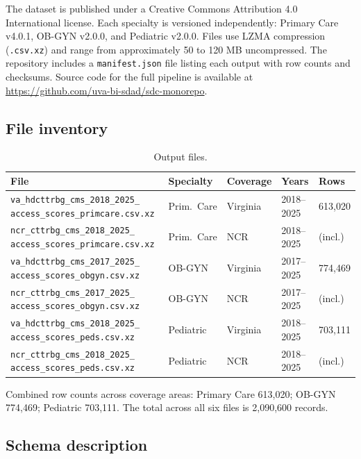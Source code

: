 \documentclass{CUP-JNL-DAP}%
\begin{document}
The dataset is published under a Creative Commons Attribution 4.0 International license. Each specialty is versioned independently: Primary Care v4.0.1, OB-GYN v2.0.0, and Pediatric v2.0.0. Files use LZMA compression (\texttt{.csv.xz}) and range from approximately 50 to 120 MB uncompressed. The repository includes a \texttt{manifest.json} file listing each output with row counts and checksums. Source code for the full pipeline is available at \url{https://github.com/uva-bi-sdad/sdc-monorepo}.

\subsection{File inventory}

\begin{table}[ht]
\centering
\caption{Output files.}
\label{tab:files}
\footnotesize
\begin{tabularx}{\textwidth}{Xllll}
\toprule
File & Specialty & Coverage & Years & Rows \\
\midrule
\texttt{va\_hdcttrbg\_cms\_2018\_2025\_ access\_scores\_primcare.csv.xz} & Prim.\ Care & Virginia & 2018--2025 & 613{,}020 \\
\texttt{ncr\_cttrbg\_cms\_2018\_2025\_ access\_scores\_primcare.csv.xz} & Prim.\ Care & NCR & 2018--2025 & (incl.) \\
\texttt{va\_hdcttrbg\_cms\_2017\_2025\_ access\_scores\_obgyn.csv.xz} & OB-GYN & Virginia & 2017--2025 & 774{,}469 \\
\texttt{ncr\_cttrbg\_cms\_2017\_2025\_ access\_scores\_obgyn.csv.xz} & OB-GYN & NCR & 2017--2025 & (incl.) \\
\texttt{va\_hdcttrbg\_cms\_2018\_2025\_ access\_scores\_peds.csv.xz} & Pediatric & Virginia & 2018--2025 & 703{,}111 \\
\texttt{ncr\_cttrbg\_cms\_2018\_2025\_ access\_scores\_peds.csv.xz} & Pediatric & NCR & 2018--2025 & (incl.) \\
\bottomrule
\end{tabularx}
\end{table}

Combined row counts across coverage areas: Primary Care 613,020; OB-GYN 774,469; Pediatric 703,111. The total across all six files is 2,090,600 records.

\subsection{Schema description}
\end{document}
